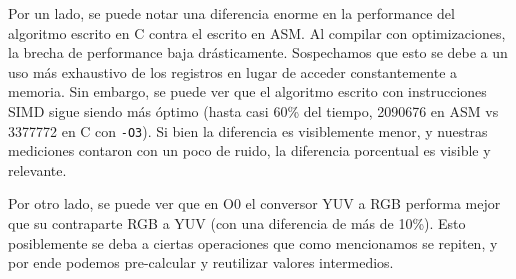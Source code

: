 Por un lado, se puede notar una diferencia enorme en la performance del algoritmo escrito en C contra el escrito en ASM. Al compilar con optimizaciones, la brecha de performance baja drásticamente. Sospechamos que esto se debe a un uso más exhaustivo de los registros en lugar de acceder constantemente a memoria. Sin embargo, se puede ver que el algoritmo escrito con instrucciones SIMD sigue siendo más óptimo (hasta casi 60\% del tiempo, 2090676 en ASM vs 3377772 en C con \texttt{-O3}). Si bien la diferencia es visiblemente menor, y nuestras mediciones contaron con un poco de ruido, la diferencia porcentual es visible y relevante.

Por otro lado, se puede ver que en O0 el conversor YUV a RGB performa mejor que su contraparte RGB a YUV (con una diferencia de más de 10\%). Esto posiblemente se deba a ciertas operaciones que como mencionamos se repiten, y por ende podemos pre-calcular y reutilizar valores intermedios.